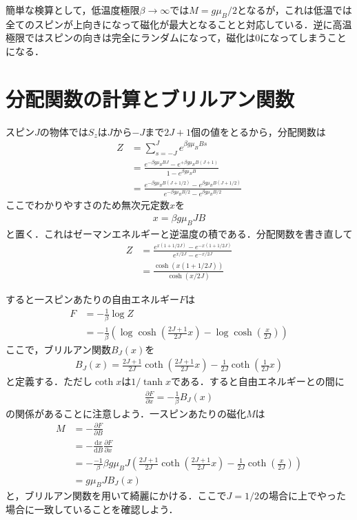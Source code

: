 \documentclass[a4j]{jarticle}
\begin{document}
簡単な検算として，低温度極限$\beta\to\infty$では$M=g\mu_B/2$となるが，これは低温では全てのスピンが上向きになって磁化が最大となることと対応している．逆に高温極限ではスピンの向きは完全にランダムになって，磁化は$0$になってしまうことになる．


\section{分配関数の計算とブリルアン関数}
スピン$J$の物体では$S_z$は$J$から$-J$まで$2J+1$個の値をとるから，分配関数は
\begin{align*}
 Z&=\sum_{s=-J}^{J}e^{\beta g\mu_BB s} \\
 &=\frac{e^{-\beta g\mu_BBJ}-e^{+\beta g\mu_BB(J+1)}}{1-e^{\beta g\mu_BB}} \\
 &=\frac{e^{-\beta g\mu_BB(J+1/2)}-e^{\beta g\mu_BB(J+1/2)}}{e^{-\beta g\mu_BB/2}-e^{\beta g\mu_BB/2}}
\end{align*}
ここでわかりやすさのため無次元定数$x$を
\begin{align*}
 x=\beta g\mu_BJB
\end{align*}
と置く．これはゼーマンエネルギーと逆温度の積である．分配関数を書き直して
\begin{align*}
 Z&=\frac{e^{x(1+1/2J)}-e^{-x(1+1/2J)}}{e^{x/2J}-e^{-x/2J}} \\
&=\frac{\cosh\left(x(1+1/2J)\right)}{\cosh\left(x/2J\right)}
\end{align*}

すると一スピンあたりの自由エネルギー$F$は
\begin{align*}
 F&=-\frac{1}{\beta}\log Z \\
  &=-\frac{1}{\beta}\left(\log\cosh\left(\frac{2J+1}{2J}x\right)-\log\cosh\left(\frac{x}{2J}\right)\right)
\end{align*}
ここで，ブリルアン関数$B_J(x)$を
\begin{align*}
 B_J(x)=\frac{2J+1}{2J}\coth\left(\frac{2J+1}{2J}x\right)-\frac{1}{2J}\coth\left(\frac{1}{2J}x\right)
\end{align*}
と定義する．ただし$\coth x$は$1/\tanh x$である．すると自由エネルギーとの間に
\begin{align*}
 \frac{\partial F}{\partial x}=-\frac{1}{\beta }B_J(x)
\end{align*}
の関係があることに注意しよう．一スピンあたりの磁化$M$は
\begin{align*}
 M&=-\frac{\partial F}{\partial B} \\
&=-\frac{\mathrm{d} x}{\mathrm{d}B}\frac{\partial F}{\partial x} \\
&=-\frac{-1}{\beta }\beta g\mu_BJ\left(\frac{2J+1}{2J}\coth\left(\frac{2J+1}{2J}x\right)-\frac{1}{2J}\coth\left(\frac{x}{2J}\right)\right)\\
&=g\mu_BJB_J(x)
\end{align*}
と，ブリルアン関数を用いて綺麗にかける．ここで$J=1/2$の場合に上でやった場合に一致していることを確認しよう．
\end{document}
